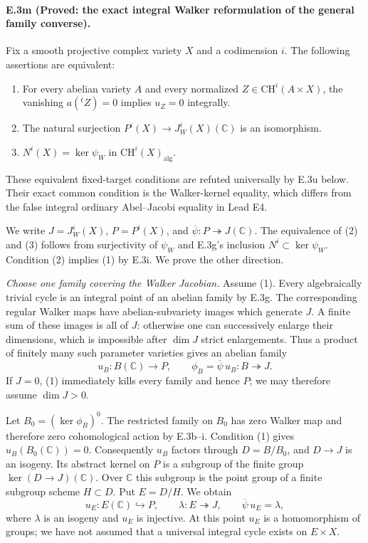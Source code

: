 \paragraph{E.3m (Proved: the exact integral Walker reformulation of the
general family converse).}
Fix a smooth projective complex variety $X$ and a codimension $i$.
The following assertions are equivalent:
\begin{enumerate}
\item For every abelian variety $A$ and every normalized
      $Z\in\mathrm{CH}^i(A\times X)$, the vanishing
      $a({}^tZ)=0$ implies $u_Z=0$ integrally.
\item The natural surjection
      $P^i(X)\to J_W^i(X)(\mathbb C)$ is an isomorphism.
\item $N^i(X)=\ker\psi_W$ in $\mathrm{CH}^i(X)_{\mathrm{alg}}$.
\end{enumerate}
These equivalent fixed-target conditions are refuted
universally by E.3u below. Their exact common condition is
the Walker-kernel equality, which differs from the false
integral ordinary Abel--Jacobi equality in Lead E4.

We write $J=J_W^i(X)$, $P=P^i(X)$, and
$\overline\psi:P\twoheadrightarrow J(\mathbb C)$.
The equivalence of (2) and (3) follows from surjectivity of
$\psi_W$ and E.3g's inclusion $N^i\subset\ker\psi_W$.
Condition (2) implies (1) by E.3i. We prove the other direction.

\emph{Choose one family covering the Walker Jacobian.}
Assume (1). Every algebraically trivial cycle is an integral
point of an abelian family by E.3g. The corresponding regular
Walker maps have abelian-subvariety images which generate $J$.
A finite sum of these images is all of $J$: otherwise one can
successively enlarge their dimensions, which is impossible
after $\dim J$ strict enlargements. Thus a product of finitely
many such parameter varieties gives an abelian family
\[
 u_B:B(\mathbb C)\longrightarrow P,\qquad
 \phi_B=\overline\psi\,u_B:B\twoheadrightarrow J.
\]
If $J=0$, (1) immediately kills every family and hence $P$;
we may therefore assume $\dim J>0$.

Let $B_0=(\ker\phi_B)^0$. The restricted family on $B_0$
has zero Walker map and therefore zero cohomological action
by E.3b--i. Condition (1) gives $u_B(B_0(\mathbb C))=0$.
Consequently $u_B$ factors through $D=B/B_0$, and
$D\to J$ is an isogeny. Its abstract kernel on $P$ is a
subgroup of the finite group $\ker(D\to J)(\mathbb C)$.
Over $\mathbb C$ this subgroup is the point group of a finite
subgroup scheme $H\subset D$. Put $E=D/H$. We obtain
\[
 u_E:E(\mathbb C)\hookrightarrow P,
 \qquad \lambda:E\twoheadrightarrow J,
 \qquad \overline\psi\,u_E=\lambda,
\]
where $\lambda$ is an isogeny and $u_E$ is injective. At this
point $u_E$ is a homomorphism of groups; we have not assumed
that a universal integral cycle exists on $E\times X$.

